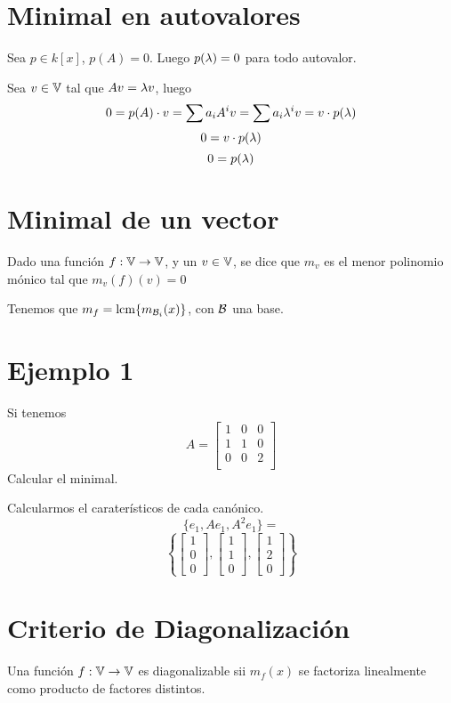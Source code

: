 \documentclass{article}
\begin{document}
\section*{Minimal en autovalores}
Sea $p \in k[x]$, $p(A) = 0$. Luego $p(\lambda) = 0$ para todo autovalor.

Sea $v \in \mathbb{V}$ tal que $Av = \lambda v$, luego
\[0 = p(A) \cdot v = \sum a_iA^iv = \sum a_i\lambda^iv = v \cdot p(\lambda)\]
\[0 = v \cdot p(\lambda)\]
\[0 = p(\lambda)\]

\section*{Minimal de un vector}
Dado una función $f : \mathbb{V} \to \mathbb{V}$, y un $v \in \mathbb{V}$, se dice que $m_v$ es el menor polinomio mónico tal que $m_v(f)(v) = 0$

Tenemos que $m_f = \operatorname{lcm} \{m_{\mathcal{B}_i}(x)\}$, con $\mathcal{B}$ una base.

\section*{Ejemplo 1}
Si tenemos
\[
	A =
	\begin{bmatrix}
		1 & 0 & 0 \\
		1 & 1 & 0 \\
		0 & 0 & 2 \\
	\end{bmatrix}
\]
Calcular el minimal.

Calcularmos el caraterísticos de cada canónico.
\[\{e_1, Ae_1, A^2e_1\}=\]
\[\left\{
		\begin{bmatrix}
			1 \\ 0 \\ 0
		\end{bmatrix},
		\begin{bmatrix}
			1 \\ 1 \\ 0
		\end{bmatrix},
		\begin{bmatrix}
			1 \\ 2 \\ 0
		\end{bmatrix}
\right\}\]

\section*{Criterio de Diagonalización}
Una función $f : \mathbb{V} \to \mathbb{V}$ es diagonalizable sii $m_f(x)$ se factoriza linealmente como producto de factores distintos.
\end{document}
